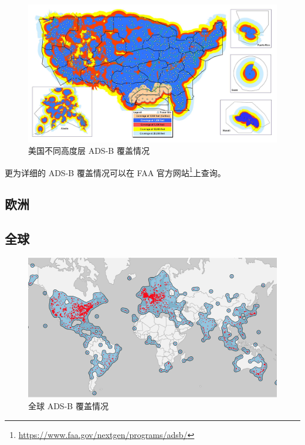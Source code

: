 \begin{figure}[htbp]
\centering
\includegraphics[width=14cm]{pic/ADSB-final.png}
\caption{美国不同高度层 ADS-B 覆盖情况}
\label{fig:ADSB-final}
\end{figure}

更为详细的 ADS-B 覆盖情况可以在 FAA 官方网站\footnote{\url{https://www.faa.gov/nextgen/programs/adsb/}}上查询。

\subsection{欧洲}


\subsection{全球}

\begin{figure}[htbp]
\centering
\includegraphics[width=14cm]{pic/1ADS-B-coverage.png}
\caption{全球 ADS-B 覆盖情况}
\label{fig:1ADS-B-coverage}
\end{figure}